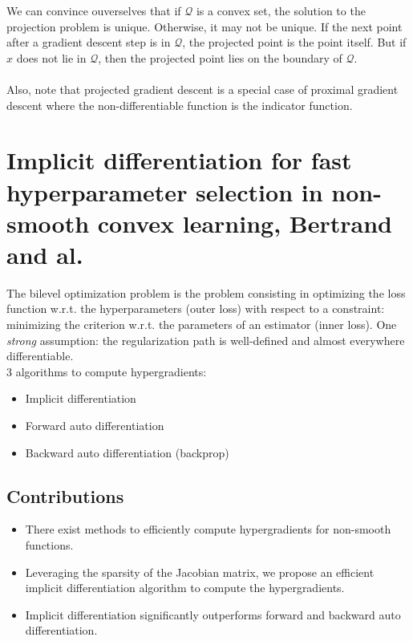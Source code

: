 \documentclass[a4paper,10pt]{article}
\theoremstyle{definition}
\begin{document}
We can convince ouverselves that if $\mathcal{Q}$ is a convex set, the solution to the projection problem is unique. Otherwise, it may
not be unique. If the next point after a gradient descent step is in $\mathcal{Q}$, the projected point is the point itself. But if $x$
does not lie in $\mathcal{Q}$, then the projected point lies on the boundary of $\mathcal{Q}$.
\\
\\
Also, note that projected gradient descent is a special case of proximal gradient descent where the
non-differentiable function is the indicator function.


\section{Implicit differentiation for fast hyperparameter selection in non-smooth convex learning, Bertrand and al.}

The bilevel optimization problem is the problem consisting in optimizing the loss function w.r.t. the hyperparameters (outer loss)
with respect to a constraint: minimizing the criterion w.r.t. the parameters  of an estimator (inner loss).
One \textit{strong} assumption: the regularization path is well-defined and almost everywhere differentiable.\\

3 algorithms to compute hypergradients:
\begin{itemize}
    \item Implicit differentiation
    \item Forward auto differentiation
    \item Backward auto differentiation (backprop)
\end{itemize}

\subsection*{Contributions}

\begin{itemize}
    \item There exist methods to efficiently compute hypergradients for non-smooth functions.
    \item Leveraging the sparsity of the Jacobian matrix, we propose an efficient implicit differentiation algorithm to compute the hypergradients.
    \item Implicit differentiation significantly outperforms forward and backward auto differentiation.
\end{itemize}
\end{document}
